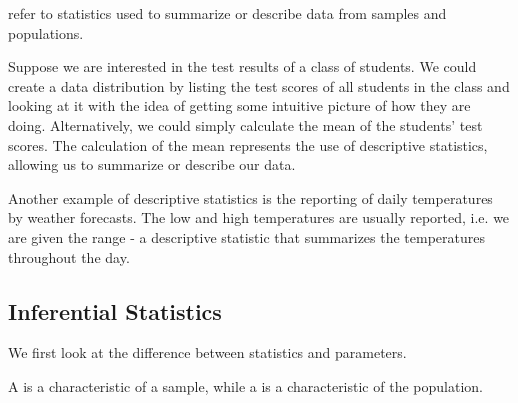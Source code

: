 \begin{definition}
     refer to statistics used to summarize or describe data from samples and populations.
\end{definition}

\begin{example}
    Suppose we are interested in the test results of a class of students. We could create a data distribution by listing the test scores of all students in the class and looking at it with the idea of getting some intuitive picture of how they are doing. Alternatively, we could simply calculate the mean of the students' test scores. The calculation of the mean represents the use of descriptive statistics, allowing us to summarize or describe our data.

    Another example of descriptive statistics is the reporting of daily temperatures by weather forecasts. The low and high temperatures are usually reported, i.e. we are given the range - a descriptive statistic that summarizes the temperatures throughout the day.
\end{example}

\subsection{Inferential Statistics}

We first look at the difference between statistics and parameters.

\begin{definition}
    A  is a characteristic of a sample, while a  is a characteristic of the population.
\end{definition}